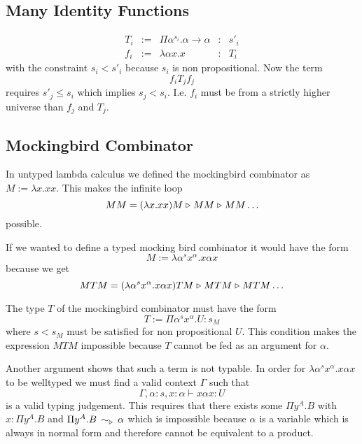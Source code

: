 \subsection{Many Identity Functions}


$$
\begin{array}{lllll}
  T_i &:=& \Pi \alpha^{s_i}. \alpha \to \alpha  &:& s'_i
  \\
  f_i &:=& \lambda \alpha x . x &:& T_i
\end{array}
$$
with the constraint $s_i < s'_i$ because $s_i$ is non propositional. Now the
term
$$
  f_i T_j f_j
$$
requires $s'_j \le s_i$ which implies $s_j < s_i$. I.e. $f_i$ must be from a
strictly higher universe than $f_j$ and $T_j$.





\subsection{Mockingbird Combinator}

In untyped lambda calculus we defined the mockingbird combinator as $M :=
\lambda x . x x$. This makes the infinite loop
$$
MM = (\lambda x . x x) M \mathrel{\triangleright} M M \mathrel{\triangleright} M M \ldots
$$
%
possible.

If we wanted to define a typed mocking bird combinator it would have the form
$$
M := \lambda \alpha^s x^\alpha. x \alpha x
$$
because we get
$$
M T M
= (\lambda \alpha^s x^\alpha. x \alpha x) T M
\mathrel{\triangleright} M T M
\mathrel{\triangleright} M T M \ldots
$$

The type $T$ of the mockingbird combinator must have the form
$$
T := \Pi \alpha^s x^\alpha. U : s_M
$$
where $s < s_M$ must be satisfied for non propositional $U$. This condition
makes the expression $M T M$ impossible because $T$ cannot be fed as an
argument for $\alpha$.

Another argument shows that such a term is not typable. In order for
$\lambda \alpha^s x^\alpha. x \alpha x$ to be welltyped we must find a valid
context $\Gamma$ such that
$$
\Gamma,\alpha:s,x:\alpha \vdash x \alpha x : U
$$
is a valid typing judgement. This requires that there exists some $\Pi y^A.B$
with $x: \Pi y^A.B$ and $\Pi y^A.B \,\sim_\triangleright\, \alpha$ which is impossible
because $\alpha$ is a variable which is always in normal form and therefore
cannot be equivalent to a product.


